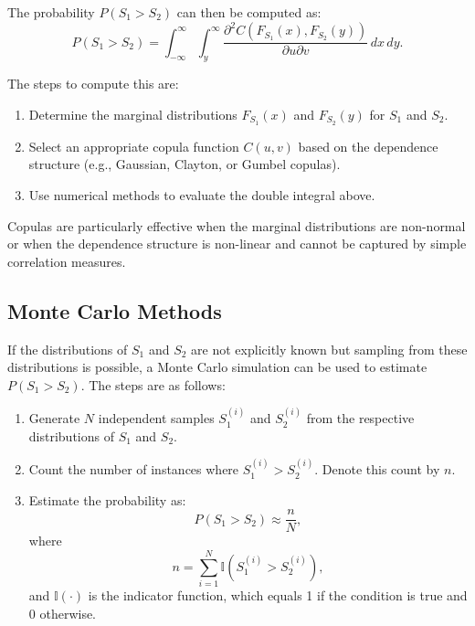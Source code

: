 The probability $P(S_1 > S_2)$ can then be computed as:
\begin{equation}
P(S_1 > S_2) = \int_{-\infty}^\infty \int_{y}^\infty \frac{\partial^2 C(F_{S_1}(x), F_{S_2}(y))}{\partial u \partial v} \, dx \, dy.
\end{equation}

The steps to compute this are:
\begin{enumerate}
    \item Determine the marginal distributions $F_{S_1}(x)$ and $F_{S_2}(y)$ for $S_1$ and $S_2$.
    \item Select an appropriate copula function $C(u, v)$ based on the dependence structure (e.g., Gaussian, Clayton, or Gumbel copulas).
    \item Use numerical methods to evaluate the double integral above.
\end{enumerate}

Copulas are particularly effective when the marginal distributions are non-normal or when the dependence structure is non-linear and cannot be captured by simple correlation measures.

\subsection{Monte Carlo Methods}

If the distributions of $S_1$ and $S_2$ are not explicitly known but sampling from these distributions is possible, a Monte Carlo simulation can be used to estimate $P(S_1 > S_2)$. The steps are as follows:
\begin{enumerate}
    \item Generate $N$ independent samples $S_1^{(i)}$ and $S_2^{(i)}$ from the respective distributions of $S_1$ and $S_2$.
    \item Count the number of instances where $S_1^{(i)} > S_2^{(i)}$. Denote this count by $n$.
    \item Estimate the probability as:
    \begin{equation}
    P(S_1 > S_2) \approx \frac{n}{N},
    \end{equation}
    where
    \begin{equation}
    n = \sum_{i=1}^N \mathbb{I}(S_1^{(i)} > S_2^{(i)}),
    \end{equation}
    and $\mathbb{I}(\cdot)$ is the indicator function, which equals 1 if the condition is true and 0 otherwise.
\end{enumerate}

